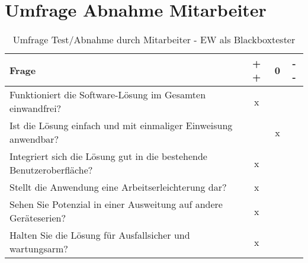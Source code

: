 \section{Umfrage Abnahme Mitarbeiter}
\begin{table}[ht]
    \begin{center}
        \begin{tabular}{| l | c | c | c |}
            \hline
            \textbf{Frage}                                                       & \textbf{+ +} & \textbf{0} & \textbf{- -} \\
            \hline
            Funktioniert die Software-Lösung im Gesamten einwandfrei?            & x            &            &              \\
            \hline
            Ist die Lösung einfach und mit einmaliger Einweisung anwendbar?      &             & x           &              \\
            \hline
            Integriert sich die Lösung gut in die bestehende Benutzeroberfläche? & x            &            &              \\
            \hline
            Stellt die Anwendung eine Arbeitserleichterung dar?                  & x            &            &              \\
            \hline
            Sehen Sie Potenzial in einer Ausweitung auf andere Geräteserien?     & x            &            &              \\
            \hline
            Halten Sie die Lösung für Ausfallsicher und wartungsarm?             & x             &           &              \\
            \hline
        \end{tabular}
    \end{center}
    \caption{Umfrage Test/Abnahme durch Mitarbeiter - EW als Blackboxtester }
    \label{umfrage_firma_ag}
\end{table}


